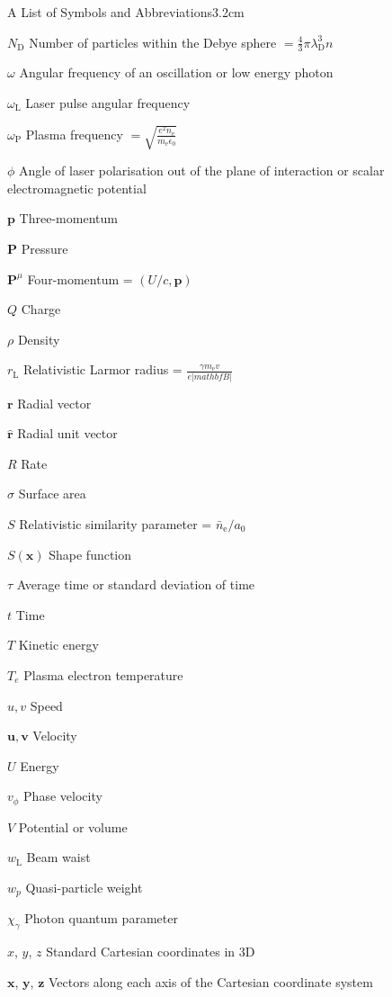 \begin{mclistof}{A List of Symbols and Abbreviations}{3.2cm}
\item[$N_\mathrm{D}$] Number of particles within the Debye sphere $= \frac{4}{3}\pi \lambda^3_\mathrm{D}n$
\item[$\omega$] Angular frequency of an oscillation or low energy photon
\item[$\omega_\mathrm{L}$] Laser pulse angular frequency
\item[$\omega_\mathrm{P}$] Plasma frequency $= \sqrt{\frac{e^2n_\mathrm{e}}{m_\mathrm{e}\epsilon_0}}$
\item[$\phi$] Angle of laser polarisation out of the plane of interaction or scalar electromagnetic potential
\item[$\mathbf{p}$] Three-momentum
\item[$\mathbf{P}$] Pressure
\item[$\mathbf{P}^\mu$] Four-momentum = $(U/c, \mathbf{p})$
\item[$Q$] Charge
\item[$\rho$] Density
\item[$r_\mathrm{L}$] Relativistic Larmor radius  = $\frac{\gamma m_\mathrm{e} v}{e|mathbf{B}|}$
\item[$\mathbf{r}$] Radial vector
\item[$\hat{\mathbf{r}}$] Radial unit vector
\item[$R$] Rate
\item[$\sigma$] Surface area
\item[$S$] Relativistic similarity parameter = $\bar{n}_\mathrm{e}/a_0$
\item[$S(\mathbf{x})$] Shape function
\item[$\tau$] Average time or standard deviation of time
\item[$t$] Time
\item[$T$] Kinetic energy
\item[$T_e$] Plasma electron temperature
\item[$u,v$] Speed
\item[$\mathbf{u},\mathbf{v}$] Velocity
\item[$U$] Energy
\item[$v_\phi$] Phase velocity
\item[$V$] Potential or volume
\item[$w_\mathrm{L}$] Beam waist
\item[$w_p$] Quasi-particle weight
\item[$\chi_\gamma$] Photon quantum parameter
\item[$x$, $y$, $z$] Standard Cartesian coordinates in 3D
\item[$\mathbf{x}$, $\mathbf{y}$, $\mathbf{z}$] Vectors along each axis of the Cartesian coordinate system

\end{mclistof}
